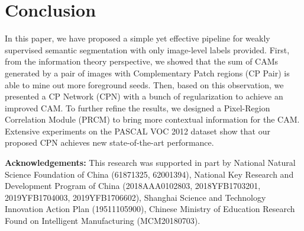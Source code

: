 \documentclass[10pt,twocolumn,letterpaper]{article}
\begin{document}
\section{Conclusion}
In this paper, we have proposed a simple yet effective pipeline for weakly supervised semantic segmentation with only image-level labels provided. First, from the information theory perspective, we showed that the sum of CAMs generated by a pair of images with Complementary Patch regions (CP Pair) is able to mine out more foreground seeds.
Then, based on this observation, we presented a CP Network (CPN) with a bunch of regularization to achieve an improved CAM.
To further refine the results, we designed a Pixel-Region Correlation Module (PRCM) to bring more contextual information for the CAM. Extensive experiments on the PASCAL VOC 2012 dataset show that our proposed CPN achieves new state-of-the-art performance.

\noindent\textbf{Acknowledgements:}\; This research was supported in part by National Natural Science Foundation of China (61871325, 62001394), National Key Research and Development Program of China (2018AAA0102803, 2018YFB1703201, 2019YFB1704003, 2019YFB1706602), Shanghai Science and Technology Innovation Action Plan (19511105900), Chinese Ministry of Education Research Found on Intelligent Manufacturing (MCM20180703).

{\small


}
\end{document}
